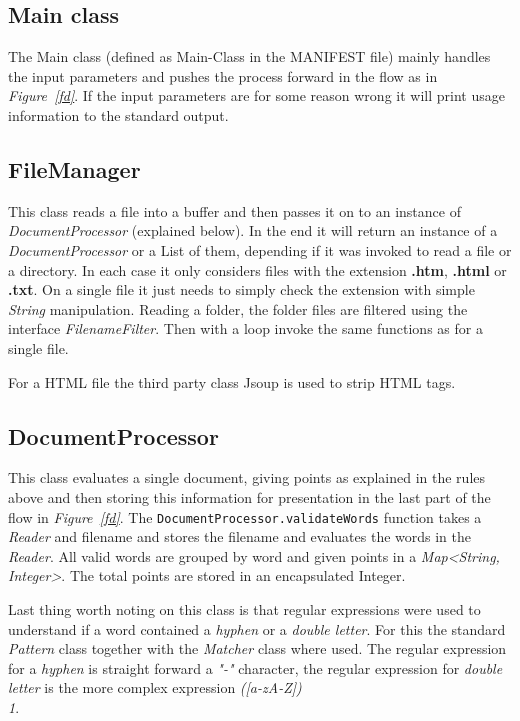 \documentclass[a4paper]{article}
\begin{document}
\subsection{Main class}
The Main class (defined as Main-Class in the MANIFEST file) mainly handles the input parameters and pushes the process forward in the flow as in \textit{Figure~\ref{fd}}. If the input parameters are for some reason wrong it will print usage information to the standard output.

\subsection{FileManager}
This class reads a file into a buffer and then passes it on to an instance of \textit{DocumentProcessor} (explained below). In the end it will return an instance of a \textit{DocumentProcessor} or a List of them, depending if it was invoked to read a file or a directory. In each case it only considers files with the extension {\bf.htm}, {\bf.html} or {\bf.txt}. On a single file it just needs to simply check the extension with simple \textit{String} manipulation. Reading a folder, the folder files are filtered using the interface \textit{FilenameFilter}. Then with a loop invoke the same functions as for a single file. 

For a HTML file the third party class Jsoup is used to strip HTML tags\cite{jsoup}.

\subsection{DocumentProcessor}
This class evaluates a single document, giving points as explained in the rules above and then storing this information for presentation in the last part of the flow in \textit{Figure~\ref{fd}}. The \verb:DocumentProcessor.validateWords: function takes a \textit{Reader} and filename and stores the filename and evaluates the words in the \textit{Reader}. All valid words are grouped by word and given points in a \textit{Map<String, Integer>}. The total points are stored in an encapsulated Integer.

Last thing worth noting on this class is that regular expressions were used to understand if a word contained a \textit{hyphen} or a \textit{double letter}. For this the standard \textit{Pattern} class together with the \textit{Matcher} class where used. The regular expression for a \textit{hyphen} is straight forward a \textit{"-"} character, the regular expression for \textit{double letter} is the more complex expression \textit{([a-zA-Z])\\1}.
\end{document}

